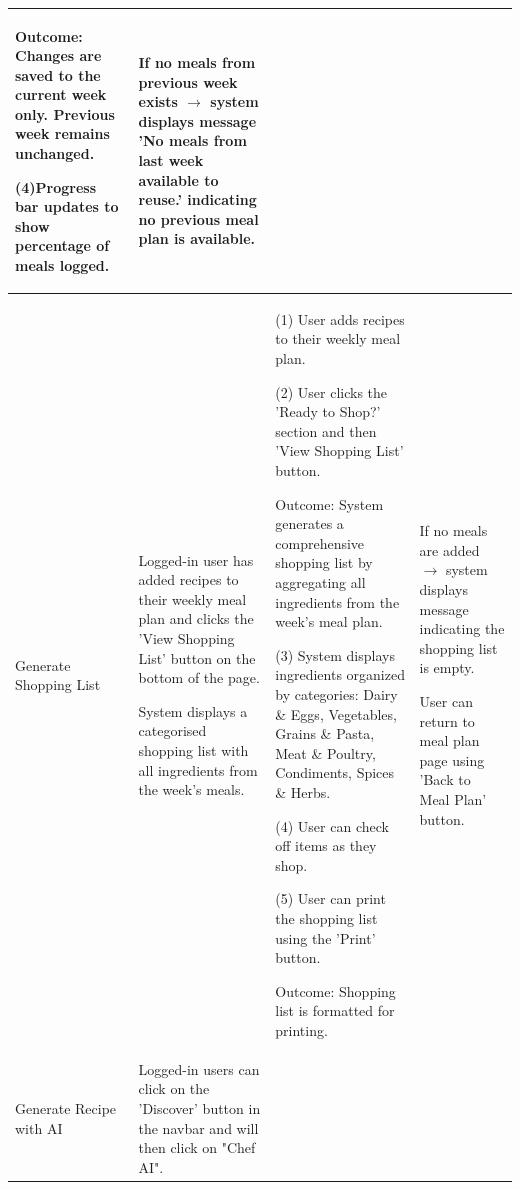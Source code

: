 \documentclass[10pt,a4paper]{article}
\begin{document}
\begin{longtable}{|p{30mm}|p{30mm}|p{40mm}|p{40mm}|}
Outcome: Changes are saved to the current week only. Previous week remains unchanged.

\vspace{1 mm}

(4)Progress bar updates to show percentage of meals logged.

&
If no meals from previous week exists $\rightarrow$ system displays message 'No meals from last week available to reuse.' indicating no previous meal plan is available. \\




\hline
Generate Shopping List
&
Logged-in user has added recipes to their weekly meal plan and clicks the 'View Shopping List' button on the bottom of the page.

System displays a categorised shopping list with all ingredients from the week's meals.
&
(1) User adds recipes to their weekly meal plan.

\vspace{1 mm}

(2) User clicks the 'Ready to Shop?' section and then 'View Shopping List' button.

Outcome: System generates a comprehensive shopping list by aggregating all ingredients from the week's meal plan.

\vspace{1 mm}

(3) System displays ingredients organized by categories: Dairy \& Eggs, Vegetables, Grains \& Pasta, Meat \& Poultry, Condiments, Spices \& Herbs.

\vspace{1 mm}

(4) User can check off items as they shop. 

\vspace{1 mm}

(5) User can print the shopping list using the 'Print' button.  

Outcome: Shopping list is formatted for printing.
&
If no meals are added $\rightarrow$ system displays message indicating the shopping list is empty.  

\vspace{1 mm}


User can return to meal plan page using 'Back to Meal Plan' button. \\
    




\hline
Generate Recipe with AI
&
Logged-in users can click on the 'Discover' button in the navbar and will then click on "Chef AI".


\end{longtable}
\end{document}
